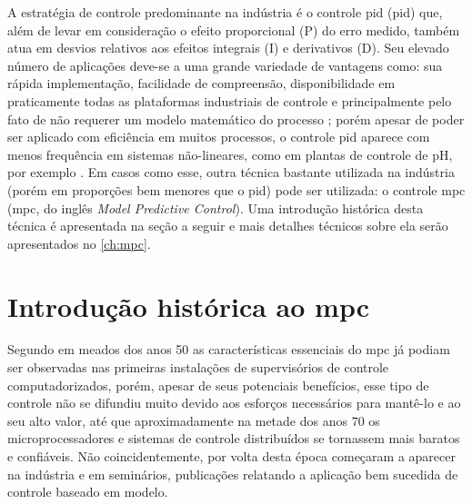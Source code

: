 A estratégia de controle predominante na indústria é o controle \acrshort{pid}
(\acrlong{pid}) \cite{Camacho2007} que, além de levar em consideração o efeito proporcional (P) do erro
medido, também atua em desvios relativos aos efeitos integrais (I) e derivativos (D).
Seu elevado número de aplicações deve-se a uma grande variedade de vantagens como:
sua rápida implementação, facilidade de compreensão, disponibilidade em praticamente
todas as plataformas industriais de controle e principalmente pelo fato de não requerer
um modelo matemático do processo \cite{Goncalves2012}; porém apesar de poder ser aplicado com eficiência em
muitos processos, o controle \acrshort{pid} aparece com menos frequência
em sistemas não-lineares, como em plantas de controle de pH, por exemplo \cite{Goncalves2012}. Em casos como
esse, outra técnica bastante utilizada na indústria (porém em proporções bem menores
que o \acrshort{pid}) pode ser utilizada: o controle \acrshort{mpc} (\acrlong{mpc},
do inglês \textit{Model Predictive Control}). Uma introdução histórica desta técnica é apresentada
na seção a seguir e mais detalhes técnicos sobre ela serão apresentados no \cref{ch:mpc}.


\section{Introdução histórica ao \acrshort{mpc}}
\label{sec:intro_mpc}

Segundo  em meados dos anos 50 as características essenciais do \acrshort{mpc}
já podiam ser observadas nas primeiras instalações de supervisórios de controle computadorizados,
porém, apesar de seus potenciais benefícios, esse tipo de controle não se difundiu muito
devido aos esforços necessários para mantê-lo e ao seu alto valor, até que aproximadamente
na metade dos anos 70 os microprocessadores e sistemas de controle distribuídos se tornassem
mais baratos e confiáveis. Não coincidentemente, por volta desta época começaram a aparecer na indústria
e em seminários, publicações relatando a aplicação bem sucedida de controle baseado em modelo. \cite{Lee2011}

